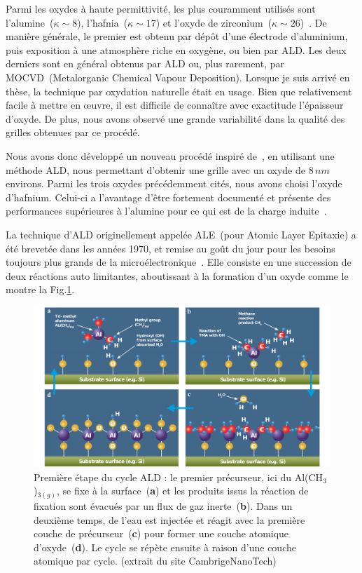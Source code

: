 Parmi les oxydes à haute permittivité, les plus couramment utilisés sont l'alumine~($\kappa \sim 8$), l'hafnia~($\kappa \sim 17$) et l'oxyde de zirconium~($\kappa \sim 26$)~\cite{Biercuk2003}. De manière générale, le premier est obtenu par dépôt d'une électrode d'aluminium, puis exposition à une atmosphère riche en oxygène, ou bien par ALD. Les deux derniers sont en général obtenus par ALD ou, plus rarement, par MOCVD~(Metalorganic Chemical Vapour Deposition). Lorsque je suis arrivé en thèse, la technique par oxydation naturelle était en usage. Bien que relativement facile à mettre en œuvre, il est difficile de connaître avec exactitude l'épaisseur d'oxyde. De plus, nous avons observé une grande variabilité dans la qualité des grilles obtenues par ce procédé.

Nous avons donc développé un nouveau procédé inspiré de~\cite{Biercuk2003}, en utilisant une méthode ALD, nous permettant d'obtenir une grille avec un oxyde de $8\,nm$ environs. Parmi les trois oxydes précédemment cités, nous avons choisi l'oxyde d'hafnium. Celui-ci a l'avantage d'être fortement documenté et présente des performances supérieures à l'alumine pour ce qui est de la charge induite~\cite{Biercuk2003}. 

La technique d'ALD originellement appelée ALE~(pour Atomic Layer Epitaxie) a été brevetée dans les années 1970, et remise au goût du jour pour les besoins toujours plus grands de la microélectronique~\cite{Leskelae2003}. Elle consiste en une succession de deux réactions auto limitantes, aboutissant à la formation d'un oxyde comme le montre la Fig.\ref{ALD}.

\begin{figure}
\centering \includegraphics[scale=0.45]{Fabrication/ALD/ALD.pdf}
\caption{Première étape du cycle ALD : le premier précurseur, ici du Al(CH$_3$)$_{3(g)}$, se fixe à la surface~(\textbf{a}) et les produits issus la réaction de fixation sont évacués par un flux de gaz inerte~(\textbf{b}). Dans un deuxième temps, de l'eau est injectée et réagit avec la première couche de précurseur~(\textbf{c}) pour former une couche atomique d'oxyde~(\textbf{d}). Le cycle se répète ensuite à raison d'une couche atomique par cycle. (extrait du site CambrigeNanoTech)}
\label{ALD}
\end{figure}


